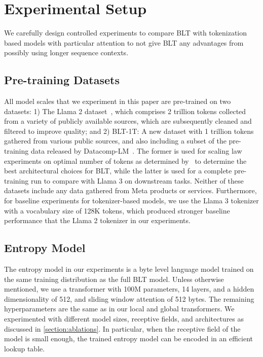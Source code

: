 \section{Experimental Setup}
\label{section:experiments}
We carefully design controlled experiments to compare {\textsc BLT} with tokenization based models with particular attention to not give {\textsc BLT} any advantages from possibly using longer sequence contexts. 

\subsection{Pre-training Datasets} All model scales that we experiment in this paper are pre-trained on two datasets: 1) The Llama 2 dataset~\citep{touvron2023llama}, which comprises 2 trillion tokens collected from a variety of publicly available sources, which are subsequently cleaned and filtered to improve quality; and 2) {\textsc BLT}-1T: A new dataset with 1 trillion tokens gathered from various public sources, and also including a subset of the pre-training data released by Datacomp-LM~\citep{li2024datacomp}. The former is used for scaling law experiments on optimal number of tokens as determined by~\cite{dubey2024llama} to determine the best architectural choices for {\textsc BLT}, while the latter is used for a complete pre-training run to compare with Llama 3 on downstream tasks. Neither of these datasets include any data gathered from Meta products or services. Furthermore, for baseline experiments for tokenizer-based models, we use the Llama 3 tokenizer with a vocabulary size of 128K tokens, which produced stronger baseline performance that the Llama 2 tokenizer in our experiments.

\subsection{Entropy Model} The entropy model in our experiments is a byte level language model trained on the same training distribution as the full {\textsc BLT} model. Unless otherwise mentioned, we use a transformer with 100M parameters, 14 layers, and a hidden dimensionality of 512, and sliding window attention of 512 bytes. The remaining hyperparameters are the same as in our local and global transformers. We  experimented with different model sizes, receptive fields, and architectures as discussed in \autoref{section:ablations}. In particular, when the receptive field of the model is small enough, the trained entropy model can be encoded in an efficient lookup table.

